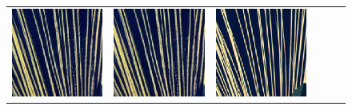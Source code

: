\begin{figure}[!ht]
\begin{tabular}[t]{c c c c c c}
    \includegraphics[width=\xwidth]{cp2/figures/sr/scaling_sr_c512_1.png} &
    \includegraphics[width=\xwidth]{cp2/figures/sr/scaling_sr_c512_1.png} &
    \includegraphics[width=\xwidth]{cp2/figures/sr/scaling_sr_hr_1.png}

\end{tabular}
\end{figure}
